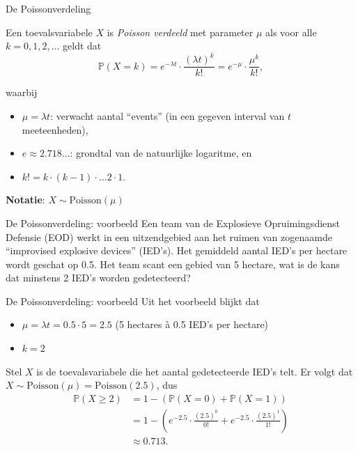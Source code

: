 \documentclass{beamer}
\newcommand{\probability}{\mathbb{P}}
\begin{document}
	\begin{frame}{De Poissonverdeling}
		
		Een toevalsvariabele $X$ is \textit{Poisson verdeeld} met parameter $\mu$ als voor alle $k = 0, 1, 2, \ldots$ geldt dat
		\[ \probability(X = k) = e^{-\lambda t} \cdot \frac{(\lambda t)^{k}}{k!} = e^{-\mu} \cdot \frac{\mu^{k}}{k!}, \]
		
		waarbij		
		
		\begin{itemize}
			\item $\mu = \lambda t$: verwacht aantal ``events'' (in een gegeven interval van $t$ meeteenheden),
			\item $e \approx 2.718...$: grondtal van de natuurlijke logaritme, en
			\item $k! = k \cdot (k-1) \cdot \ldots 2 \cdot 1$.
		\end{itemize}
	\vfill
	\textbf{Notatie}: $X \sim \textrm{Poisson}(\mu)$
	\end{frame}

	\begin{frame}{De Poissonverdeling: voorbeeld}
		Een team van de Explosieve Opruimingsdienst Defensie (EOD) werkt in een uitzendgebied aan het ruimen van zogenaamde ``improvised explosive devices'' (IED's). Het gemiddeld aantal IED's per hectare wordt geschat op 0.5.
		\vfill 
		Het team scant een gebied van 5 hectare, wat is de kans dat minstens 2 IED's worden gedetecteerd?
	\end{frame}
	
	\begin{frame}{De Poissonverdeling: voorbeeld}
		Uit het voorbeeld blijkt dat
		\begin{itemize}
			\item $\mu = \lambda t = 0.5 \cdot 5 = 2.5$ \hfill (5 hectares \`a 0.5 IED's per hectare)
			\item $k = 2$
		\end{itemize}
		\vfill
		Stel $X$ is de toevalsvariabele die het aantal gedetecteerde IED's telt.
		\vfill
		Er volgt dat $X \sim \textrm{Poisson}(\mu) = \textrm{Poisson}(2.5)$, dus
		\begin{align*}
			\probability(X  \ge 2) 	&= 1 - (\probability(X = 0) + \probability(X = 1)) \\
									&= 1 - (e^{-2.5} \cdot \frac{(2.5)^{0}}{0!} + e^{-2.5} \cdot \frac{(2.5)^{1}}{1!}) \\
									&\approx 0.713.
		\end{align*}
	\end{frame}
	
\end{document}
